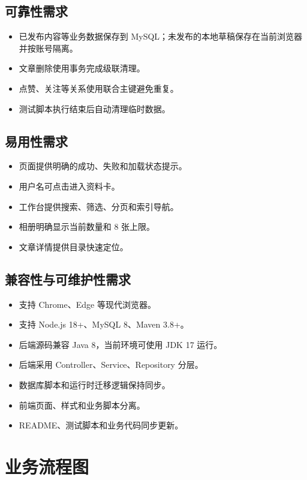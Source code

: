 \documentclass[UTF8,a4paper,12pt]{ctexart}
\begin{document}
\subsection{可靠性需求}

\begin{itemize}
  \item 已发布内容等业务数据保存到 MySQL；未发布的本地草稿保存在当前浏览器并按账号隔离。
  \item 文章删除使用事务完成级联清理。
  \item 点赞、关注等关系使用联合主键避免重复。
  \item 测试脚本执行结束后自动清理临时数据。
\end{itemize}

\subsection{易用性需求}

\begin{itemize}
  \item 页面提供明确的成功、失败和加载状态提示。
  \item 用户名可点击进入资料卡。
  \item 工作台提供搜索、筛选、分页和索引导航。
  \item 相册明确显示当前数量和 8 张上限。
  \item 文章详情提供目录快速定位。
\end{itemize}

\subsection{兼容性与可维护性需求}

\begin{itemize}
  \item 支持 Chrome、Edge 等现代浏览器。
  \item 支持 Node.js 18+、MySQL 8、Maven 3.8+。
  \item 后端源码兼容 Java 8，当前环境可使用 JDK 17 运行。
  \item 后端采用 Controller、Service、Repository 分层。
  \item 数据库脚本和运行时迁移逻辑保持同步。
  \item 前端页面、样式和业务脚本分离。
  \item README、测试脚本和业务代码同步更新。
\end{itemize}

\section{业务流程图}
\end{document}
